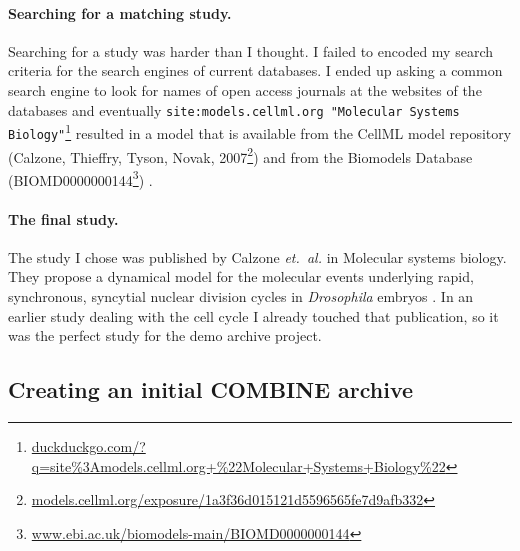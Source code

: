 \paragraph{Searching for a matching study.}
Searching for a study was harder than I thought.
I failed to encoded my search criteria for the search engines of current databases.
I ended up asking a common search engine to look for names of open access journals at the websites of the databases and eventually \texttt{site:models.cellml.org "Molecular Systems Biology"}\footnote{\href{https://duckduckgo.com/?q=site\%3Amodels.cellml.org+\%22Molecular+Systems+Biology\%22}{duckduckgo.com/?q=site\%3Amodels.cellml.org+\%22Molecular+Systems+Biology\%22}} resulted in a model that is available from the CellML model repository (Calzone, Thieffry, Tyson, Novak, 2007\footnote{\href{http://models.cellml.org/exposure/1a3f36d015121d5596565fe7d9afb332}{models.cellml.org/exposure/1a3f36d015121d5596565fe7d9afb332}}) \cite{cellmlrepo} and from the Biomodels Database (BIOMD0000000144\footnote{\href{http://www.ebi.ac.uk/biomodels-main/BIOMD0000000144}{www.ebi.ac.uk/biomodels-main/BIOMD0000000144}}) \cite{biomodels}.


\paragraph{The final study.}
The study I chose was published by Calzone \emph{et.~al.} in Molecular systems biology. They propose a dynamical model for the molecular events underlying rapid, synchronous, syncytial nuclear division cycles in \textit{Drosophila} embryos \cite{Calzone2007}.
In an earlier study dealing with the cell cycle I already touched that publication, so it was the perfect study for the demo archive project.




\subsection{Creating an initial COMBINE archive}

